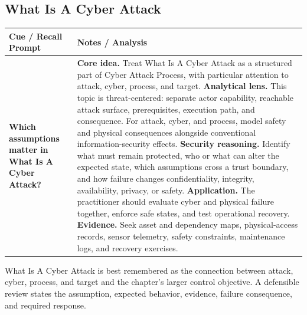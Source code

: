 \documentclass[11pt]{article}
\newcommand{\CornellHeader}{%
\rowcolor{Navy}\color{white}\bfseries Cue / Recall Prompt & \color{white}\bfseries Notes / Analysis\\\hline}
\newcommand{\CornellRow}[2]{%
\cellcolor{CueGray}\RaggedRight\textbf{#1} & \RaggedRight #2\\\hline}
\begin{document}
\subsection*{What Is A Cyber Attack}
\begin{longtable}{>{\RaggedRight\arraybackslash}p{}|>{\RaggedRight\arraybackslash}p{}}
\CornellHeader
\CornellRow{Which assumptions matter in What Is A Cyber Attack?}{\textbf{Core idea.} Treat What Is A Cyber Attack as a structured part of Cyber Attack Process, with particular attention to attack, cyber, process, and target. \textbf{Analytical lens.} This topic is threat-centered: separate actor capability, reachable attack surface, prerequisites, execution path, and consequence. For attack, cyber, and process, model safety and physical consequences alongside conventional information-security effects. \textbf{Security reasoning.} Identify what must remain protected, who or what can alter the expected state, which assumptions cross a trust boundary, and how failure changes confidentiality, integrity, availability, privacy, or safety. \textbf{Application.} The practitioner should evaluate cyber and physical failure together, enforce safe states, and test operational recovery. \textbf{Evidence.} Seek asset and dependency maps, physical-access records, sensor telemetry, safety constraints, maintenance logs, and recovery exercises.}
\end{longtable}
\begin{topicsummary}
What Is A Cyber Attack is best remembered as the connection between attack, cyber, process, and target and the chapter's larger control objective. A defensible review states the assumption, expected behavior, evidence, failure consequence, and required response.
\end{topicsummary}
\end{document}
